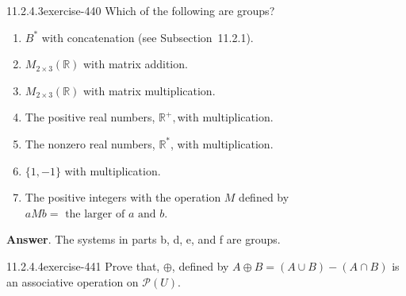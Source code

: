 \documentclass[twoside,10pt,]{book}
\numberwithin{equation}{section}
\begin{document}
\begin{divisionsolution}{11.2.4.3}{}{exercise-440}%
\hypertarget{p-3854}{}%
Which of the following are groups?\leavevmode%
\begin{enumerate}[label=(\alph*)]
\item\hypertarget{li-1759}{}\hypertarget{p-3855}{}%
\(B^*\) with concatenation (see Subsection~11.2.1).%
\item\hypertarget{li-1760}{}\hypertarget{p-3856}{}%
\(M_{2\times 3}(\mathbb{R})\) with matrix addition.%
\item\hypertarget{li-1761}{}\hypertarget{p-3857}{}%
\(M_{2\times 3}(\mathbb{R})\) with matrix multiplication.%
\item\hypertarget{li-1762}{}\hypertarget{p-3858}{}%
The positive real numbers, \(\mathbb{R}^+,\)with multiplication.%
\item\hypertarget{li-1763}{}\hypertarget{p-3859}{}%
The nonzero real numbers, \(\mathbb{R}^*\), with multiplication.%
\item\hypertarget{li-1764}{}\hypertarget{p-3860}{}%
\(\{1, -1\}\) with multiplication.%
\item\hypertarget{li-1765}{}\hypertarget{p-3861}{}%
The positive integers with the operation \(M\) defined by \(a M b = \textrm{ the larger of } a \textrm{ and } b\).%
\end{enumerate}
%
\par\smallskip%
\noindent\textbf{Answer}.\quad%
\hypertarget{p-3862}{}%
The systems in parts  b, d, e, and f are groups.%
\end{divisionsolution}%
\begin{divisionsolution}{11.2.4.4}{}{exercise-441}%
\hypertarget{p-3863}{}%
Prove that, \(\oplus\), defined by \(A \oplus  B = (A \cup  B) - (A \cap  B)\) is an associative operation on \(\mathcal{P}(U)\).%
\end{divisionsolution}%
\end{document}
